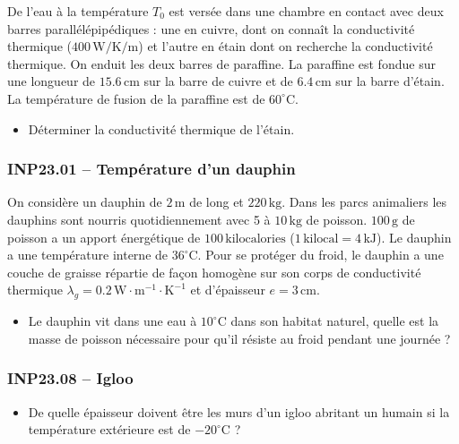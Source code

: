 De l'eau à la température $T_{0}$ est versée dans une chambre en contact avec deux barres parallélépipédiques : une en cuivre, dont on connaît la conductivité thermique ($400\,\text{W/K/m}$) et l'autre en étain dont on recherche la conductivité thermique. On enduit les deux barres de paraffine. La paraffine est fondue sur une longueur de $15.6\,\text{cm}$ sur la barre de cuivre et de $6.4\,\text{cm}$ sur la barre d'étain. La température de fusion de la paraffine est de $60^\circ\text{C}$.

\begin{itemize}[label=\textbullet]
\item Déterminer la conductivité thermique de l'étain.
\end{itemize}

\newpage
\subsubsection*{INP23.01 -- Température d'un dauphin }

On considère un dauphin de $2\,\text{m}$ de long et $220\,\text{kg}$. Dans les parcs animaliers les dauphins sont nourris quotidiennement avec 5 à $10\,\text{kg}$ de poisson. $100\,\text{g}$ de poisson a un apport énergétique de $100\,\text{kilocalories}$ ($1\,\text{kilocal}=4\,\text{kJ}$). Le dauphin a une température interne de $36^\circ\text{C}$. Pour se protéger du froid, le dauphin a une couche de graisse répartie de façon homogène sur son corps de conductivité thermique $\lambda_{g} = 0.2\,\text{W}\cdot\text{m}^{-1}\cdot\text{K}^{-1}$ et d'épaisseur $e = 3\,\text{cm}$.

\begin{itemize}[label=\textbullet]
\item Le dauphin vit dans une eau à $10^\circ\text{C}$ dans son habitat naturel, quelle est la masse de poisson nécessaire pour qu'il résiste au froid pendant une journée ?
\end{itemize}

\subsubsection*{INP23.08 -- Igloo}

\begin{itemize}[label=\textbullet]
\item De quelle épaisseur doivent être les murs d'un igloo abritant un humain si la température extérieure est de $-20^\circ\text{C}$ ?
\end{itemize}

